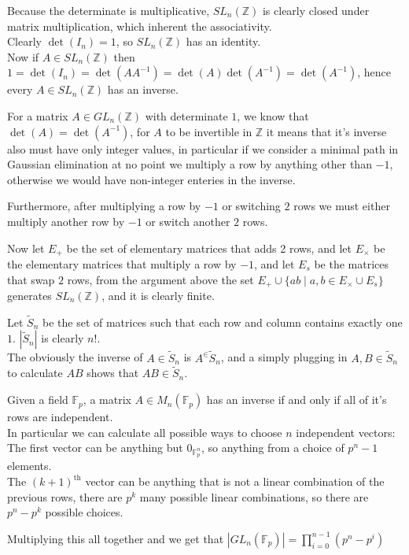\begin{cExercise}
	\begin{cPart}
		Because the determinate is multiplicative, $SL_n(\mathbb Z)$ is clearly closed under matrix multiplication, which inherent the associativity.\\
		Clearly $\det (I_n)=1$, so $SL_n(\mathbb Z)$ has an identity.\\
		Now if $A\in SL_n(\mathbb Z)$ then $1=\det(I_n)=\det (AA^{-1})=\det(A)\det(A^{-1})=\det(A^{-1})$, hence every $A\in SL_n(\mathbb Z)$ has an inverse.
	\end{cPart}
	\begin{cPart}
		For a matrix $A\in GL_n(\mathbb Z)$ with determinate $1$, we know that $\det(A)=\det(A^{-1})$, for $A$ to be invertible in $\mathbb{Z}$ it means that it's inverse also must have only integer values, in particular if we consider a minimal path in Gaussian elimination at no point we multiply a row by anything other than $-1$, otherwise we would have non-integer enteries in the inverse.
		
		Furthermore, after multiplying a row by $-1$ or switching $2$ rows we must either multiply another row by $-1$ or switch another $2$ rows.
		
		Now let $E_+$ be the set of elementary matrices that adds 2 rows, and let $E_\times$ be the elementary  matrices that multiply a row by $-1$, and let $E_s$ be the matrices that swap $2$ rows, from the argument above the set $E_+\cup\{ab\mid a,b\in E_\times\cup E_s\}$ generates $SL_n(\mathbb Z)$, and it is clearly finite.
	\end{cPart}
	\begin{cPart}
		Let $\tilde S_n$ be the set of matrices such that each row and column contains exactly one $1$. $|\tilde{S}_n|$ is clearly $n!$.\\
		The obviously the inverse of $A\in \tilde{S}_n$ is $A^\in \tilde{S}_n$, and a simply plugging in $A,B\in \tilde{S}_n$ to calculate $AB$ shows that $AB\in \tilde{S}_n$.
	\end{cPart}
	\begin{cPart}
		Given a field $\mathbb F_p$, a matrix $A\in M_n(\mathbb F_p)$ has an inverse if and only if all of it's rows are independent.\\
		In particular we can calculate all possible ways to choose $n$ independent vectors:\\
		The first vector can be anything but $0_{\mathbb F_p^n}$, so anything from a choice of $p^n-1$ elements.\\
		The $(k+1)^{\text{th}}$ vector can be anything that is not a linear combination of the previous rows, there are $p^k$ many possible linear combinations, so there are $p^n-p^k$ possible choices.
		
		Multiplying this all together and we get that $|GL_n(\mathbb F_p)|=\prod_{i=0}^{n-1}(p^n-p^i)$
	\end{cPart}
\end{cExercise}
